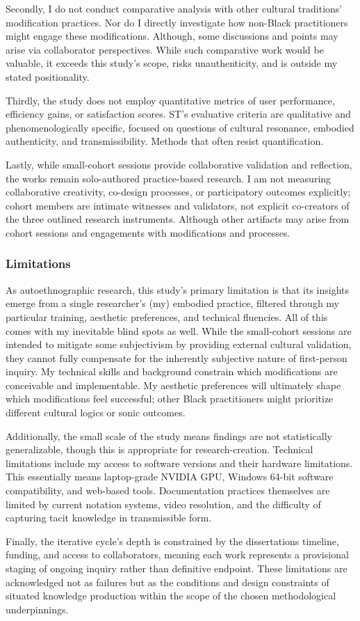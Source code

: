 Secondly, I do not conduct comparative analysis with other cultural traditions' modification practices. Nor do I directly investigate how non-Black practitioners might engage these modifications.  Although, some discussions and points may arise via collaborator perspectives. While such comparative work would be valuable, it exceeds this study's scope, risks unauthenticity, and is outside my stated positionality.

Thirdly, the study does not employ quantitative metrics of user performance, efficiency gains, or satisfaction scores. ST's evaluative criteria are qualitative and phenomenologically specific, focused on questions of cultural resonance, embodied authenticity, and transmissibility. Methods that often resist quantification.

Lastly, while small-cohort sessions provide collaborative validation and reflection, the works remain solo-authored practice-based research. I am not measuring collaborative creativity, co-design processes, or participatory outcomes explicitly; cohort members are intimate witnesses and validators, not explicit co-creators of the three outlined research instruments. Although other artifacts may arise from cohort sessions and engagements with modifications and processes.

\subsubsection{Limitations}
As autoethnographic research, this study's primary limitation is that its insights emerge from a single researcher's (my) embodied practice, filtered through my particular training, aesthetic preferences, and technical fluencies. All of this comes with my inevitable blind spots as well. While the small-cohort sessions are intended to mitigate some subjectivism by providing external cultural validation, they cannot fully compensate for the inherently subjective nature of first-person inquiry. My technical skills and background constrain which modifications are conceivable and implementable. My aesthetic preferences will ultimately shape which modifications feel successful; other Black practitioners might prioritize different cultural logics or sonic outcomes.

Additionally, the small scale of the study means findings are not statistically generalizable, though this is appropriate for research-creation. Technical limitations include my access to software versions and their hardware limitations. This essentially means laptop-grade NVIDIA GPU, Windows 64-bit software compatibility, and web-based tools. Documentation practices themselves are limited by current notation systems, video resolution, and the difficulty of capturing tacit knowledge in transmissible form.
 
Finally, the iterative cycle's depth is constrained by the dissertations timeline, funding, and access to collaborators, meaning each work represents a provisional staging of ongoing inquiry rather than definitive endpoint. These limitations are acknowledged not as failures but as the conditions and design constraints of situated knowledge production within the scope of the chosen methodological underpinnings.